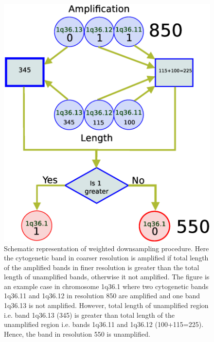 \begin{figure}[h!]
\centering
\includegraphics[scale=0.35]{figures/weighted}
\caption[Weighted downsampling]{Schematic representation of weighted downsampling procedure. Here the cytogenetic band in coarser resolution is amplified if total length of the  amplified bands in finer resolution is greater than the total length of unamplified bands, otherwise it not amplified. The figure is an example case in chromosome 1q36.1 where two cytogenetic bands 1q36.11 and 1q36.12 in resolution 850 are amplified and one band 1q36.13 is not amplified. However, total length of unamplified region i.e. band 1q36.13 (345) is greater than total length of the unamplified region i.e. bands 1q36.11 and 1q36.12 (100+115=225). Hence, the band in resolution 550 is unamplified.} \label{Fig:wamapping}
\end{figure} 

